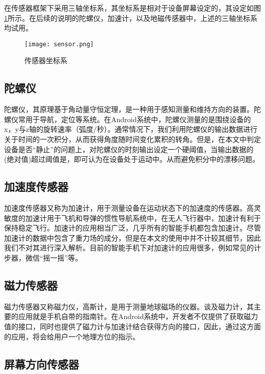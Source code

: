 \documentclass[winfonts,oneside]{njuthesis}
\begin{document}
		在传感器框架下采用三轴坐标系，其坐标系是相对于设备屏幕设定的，其设定如图\ref{fig: sensor}所示。在后续的说明的陀螺仪，加速计，以及地磁传感器中，上述的三轴坐标系均试用。		
		
		\begin{figure}[H]
			\centering
			\texttt{[image: sensor.png]} 
			\caption{传感器坐标系}
			\label{fig: sensor}
		\end{figure}
		
			
		\subsection{陀螺仪}
		
		陀螺仪，其原理基于角动量守恒定理，是一种用于感知测量和维持方向的装置。陀螺仪常用于导航，定位等系统。在Android系统中，陀螺仪测量的是围绕设备的x，y与z轴的旋转速率（弧度/秒）。通常情况下，我们利用陀螺仪的输出数据进行关于时间的一次积分，从而获得角度随时间变化累积的转角。但是，在本文中判定设备是否“静止”的问题上，对陀螺仪的时刻输出设定一个硬阈值，当输出数据的(绝对值)超过阈值是，即可认为在设备处于运动中。从而避免积分中的漂移问题。
			
		\subsection{加速度传感器}
		
		加速度传感器又称为加速计，用于测量设备在运动状态下的加速度的传感器。高灵敏度的加速计用于飞机和导弹的惯性导航系统中\cite{houanlu}，在无人飞行器中，加速计有利于保持稳定飞行。加速计的应用相当广泛，几乎所有的智能手机都包含加速计。尽管加速计的数据中包含了重力场的成分，但是在本文的使用中并不计较其细节，因此我们不对其进行深入解析。目前的智能手机下对加速计的应用很多，例如常见的计步器，微信“摇一摇”等。
						
		\subsection{磁力传感器}
		
		磁力传感器又称磁力仪，高斯计，是用于测量地球磁场的仪器。谈及磁力计，其主要的应用就是手机自带的指南针。在Android系统中，开发者不仅提供了获取磁力值的接口，同时也提供了磁力计与加速计结合获得方向的接口，因此，通过这方面的应用，将会给用户一个地理方位的指示。
			
		\subsection{屏幕方向传感器}
		
\end{document}
